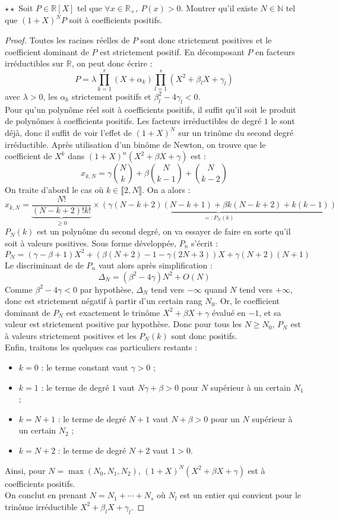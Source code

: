 \documentclass[french,a4paper]{article}
\newcommand{\N}{\mathbb{N}}
\newcommand{\R}{\mathbb{R}}
\theoremstyle{plain}
\theoremstyle{definition}
\theoremstyle{remark}
\begin{document}
\begin{ex}{$\star\star$}
	Soit $P\in\R[X]$ tel que $\forall x\in\R_+,\ P(x)>0$. Montrer qu'il existe $N\in\N$ tel que $(1+X)^NP$ soit à coefficients positifs.
\end{ex}
\begin{proof}
	Toutes les racines réelles de $P$ sont donc strictement positives et le coefficient dominant de $P$ est strictement positif. En décomposant $P$ en facteurs irréductibles sur $\R$, on peut donc écrire : $$P=\lambda\prod_{k=1}^{r}(X+\alpha_k)\prod_{l=1}^{s}(X^2+\beta_lX+\gamma_l)$$ avec $\lambda>0$, les $\alpha_k$ strictement positifs et $\beta_l^2-4\gamma_l<0$. \\ Pour qu'un polynôme réel soit à coefficients positifs, il suffit qu'il soit le produit de polynômes à coefficients positifs. Les facteurs irréductibles de degré $1$ le sont déjà, donc il suffit de voir l'effet de $(1+X)^N$ sur un trinôme du second degré irréductible. Après utilisation d'un binôme de Newton, on trouve que le coefficient de $X^k$ dans $(1+X)^n(X^2+\beta X+\gamma)$ est : $$x_{k,N}=\gamma\binom{N}{k}+\beta\binom{N}{k-1}+\binom{N}{k-2}$$ On traite d'abord le cas où $k\in\llbracket 2,N\rrbracket$. On a alors : $$x_{k,N}=\underbrace{\frac{N!}{(N-k+2)!k!}}_{\geqslant 0}\times\underbrace{(\gamma(N-k+2)(N-k+1)+\beta k(N-k+2)+k(k-1))}_{=:P_N(k)}$$ $P_N(k)$ est un polynôme du second degré, on va essayer de faire en sorte qu'il soit à valeurs positives. Sous forme développée, $P_n$ s'écrit : $$P_N=(\gamma-\beta+1)X^2+(\beta(N+2)-1-\gamma(2N+3))X+\gamma(N+2)(N+1)$$ Le discriminant de de $P_n$ vaut alors après simplification : $$\Delta_N=(\beta^2-4\gamma)N^2+O(N)$$ Comme $\beta^2-4\gamma<0$ par hypothèse, $\Delta_N$ tend vers $-\infty$ quand $N$ tend vers $+\infty$, donc est strictement négatif à partir d'un certain rang $N_0$. Or, le coefficient dominant de $P_N$ est exactement le trinôme $X^2+\beta X+\gamma$ évalué en $-1$, et sa valeur est strictement positive par hypothèse. Donc pour tous les $N\geqslant N_0$, $P_N$ est à valeurs strictement positives et les $P_N(k)$ sont donc positifs. \\ Enfin, traitons les quelques cas particuliers restants : \begin{itemize}
		\item $k=0$ : le terme constant vaut $\gamma>0$ ;
		\item $k=1$ : le terme de degré $1$ vaut $N\gamma+\beta>0$ pour $N$ supérieur à un certain $N_1$ ;
		\item $k=N+1$ : le terme de degré $N+1$ vaut $N+\beta>0$ pour un $N$ supérieur à un certain $N_2$ ;
		\item $k=N+2$ : le terme de degré $N+2$ vaut $1>0$.
	\end{itemize}
	Ainsi, pour $N= \max(N_0,N_1,N_2)$, $(1+X)^N(X^2+\beta X+\gamma)$ est à coefficients positifs. \\ On conclut en prenant $N=N_1+\cdots+N_s$ où $N_l$ est un entier qui convient pour le trinôme irréductible $X^2+\beta_l X+\gamma_l$.
\end{proof}
\end{document}
